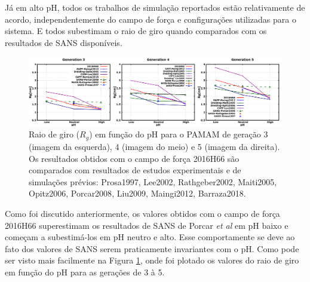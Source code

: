 Já em alto pH, todos os trabalhos de simulação reportados estão relativamente de acordo, independentemente do campo de força e configurações utilizadas para o sistema.
E todos subestimam o raio de giro quando comparados com os resultados de SANS\cite{Porcar2008} disponíveis.

\begin{figure}[ht!]
\centering
\includegraphics[width=\textwidth]{images/PAMAMgyrateGpH.png}
\caption{Raio de giro ($R_g$) em função do pH para o PAMAM de geração 3 (imagem da esquerda), 4 (imagem do meio) e 5 (imagem da direita).
Os resultados obtidos com o campo de força 2016H66\cite{Horta2016} são comparados com resultados de estudos experimentais e de simulações prévios:
Prosa1997\cite{Prosa1997}, %
Lee2002\cite{Lee2002}, %
Rathgeber2002\cite{Rathgeber2002}, %
Maiti2005\cite{Maiti2005}, %
Opitz2006\cite{Opitz2006}, %
Porcar2008\cite{Porcar2008}, %
Liu2009\cite{Liu2009}, %
Maingi2012\cite{Maingi2012}, %
Barraza2018\cite{Barraza2018}.} %
\label{fig:PAMAMRgpH}
\end{figure}

Como foi discutido anteriormente, os valores obtidos com o campo de força 2016H66\cite{Horta2016} superestimam os resultados de SANS de Porcar \textit{et al}\cite{Porcar2008} em pH baixo e começam a subestimá-los em pH neutro e alto.
Esse comportamente se deve ao fato dos valores de SANS serem praticamente invariantes com o pH.
Como pode ser visto mais facilmente na Figura \ref{fig:PAMAMRgpH}, onde foi plotado os valores do raio de giro em função do pH para as gerações de 3 à 5.

